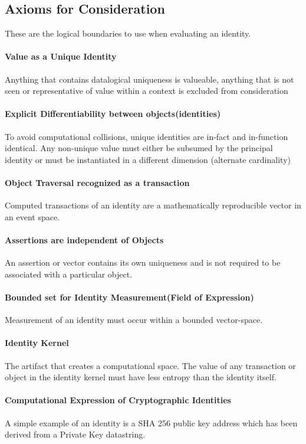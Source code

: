 \documentclass{article}
\begin{document}
		\subsection{Axioms for Consideration}These are the logical boundaries to use when evaluating an identity.
			\paragraph{Value as a Unique Identity}
				Anything that contains datalogical uniqueness is valueable, anything that is not seen or representative of value within a context is excluded from consideration
			\paragraph{Explicit Differentiability between objects(identities)}
				To avoid computational collisions, unique identities are in-fact and in-function identical.  Any non-unique value must either be subsumed by the principal identity or must be instantiated in a different dimension (alternate cardinality) 
			\paragraph{Object Traversal recognized as a transaction}
				Computed transactions of an identity are a mathematically reproducible vector in an event space.
			\paragraph{Assertions are independent of Objects}
				An assertion or vector contains its own uniqueness and is not required to be associated with a particular object.
			\paragraph{Bounded set for Identity Measurement(Field of Expression)}
				Measurement of an identity must occur within a bounded vector-space.
			\paragraph{Identity Kernel}
				The artifact that creates a computational space.  The value of any transaction or object in the identity kernel must have less entropy than the identity itself.
			\paragraph{Computational Expression of Cryptographic Identities}
				A simple example of an identity is a SHA 256 public key address which has been derived from a Private Key datastring.
\end{document}

